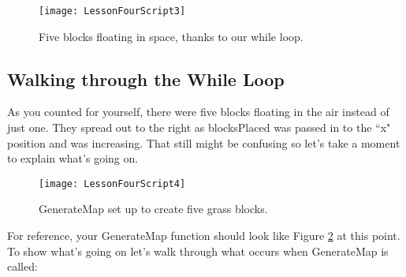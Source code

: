 \documentclass{article}
\begin{document}
\noindent{}

\begin{figure}
  \texttt{[image: LessonFourScript3]}
  \caption{Five blocks floating in space, thanks to our while loop.}
  \label{fig:LessonFourScript3}
\end{figure}

\subsection{Walking through the While Loop}

As you counted for yourself, there were five blocks floating in the air instead of just one. They spread out to the right as blocksPlaced was passed in to the ``x" position and was increasing. That still might be confusing so let's take a moment to explain what's going on.
\begin{figure}
  \texttt{[image: LessonFourScript4]}
  \caption{GenerateMap set up to create five grass blocks.}
  \label{fig:LessonFourScript4}
\end{figure}
For reference, your GenerateMap function should look like Figure \ref{fig:LessonFourScript4} at this point. To show what's going on let's walk through what occurs when GenerateMap is called: 
\end{document}
